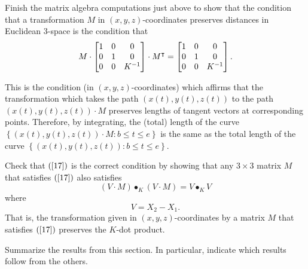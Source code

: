 \documentclass{ximera}
\begin{document}
\begin{problem}
Finish the matrix algebra computations just above to show that the condition
that a transformation $M$ in $\left(  x,y,z\right)  $-coordinates preserves
distances in Euclidean $3$-space is the condition that%
\begin{equation}
M\cdot\begin{bmatrix}
%
1 & 0 & 0\\
0 & 1 & 0\\
0 & 0 & K^{-1}%
\end{bmatrix}
  \cdot M^\transpose=\begin{bmatrix}
%
1 & 0 & 0\\
0 & 1 & 0\\
0 & 0 & K^{-1}%
\end{bmatrix}
  . \label{17}%
\end{equation}

\end{problem}

This is the condition (in $\left(  x,y,z\right)  $-coordinates) which affirms
that the transformation which takes the path $\left(  x(t),y(t),z(t)\right)  $
to the path $\left(  x(t),y(t),z(t)\right)  \cdot M$ preserves lengths of
tangent vectors at corresponding points. Therefore, by integrating, the
(total) length of the curve $\left\{  \left(  x(t),y(t),z(t)\right)  \cdot
M:b\leq t\leq e\right\}  $ is the same as the total length of the curve
$\left\{  \left(  x(t),y(t),z(t)\right)  :b\leq t\leq e\right\}  $.

\begin{problem}
Check that $\left(  \ref{17}\right)  $ is the correct condition by showing
that any $3\times3$ matrix $M$ that satisfies $\left(  \ref{17}\right)  $ also
satisfies%
\[
\left(   V  \cdot M\right)  \bullet_{K}\left(   V
\cdot M\right)  =V\bullet_{K}V
\]
where%
\[
V=X_{2}-X_{1}.
\]
That is, the transformation given in $\left(  x,y,z\right)  $-coordinates by a
matrix $M$ that satisfies $\left(  \ref{17}\right)  $ preserves the $K$-dot product.
\end{problem}

\begin{problem}
Summarize the results from this section. In particular, indicate which
results follow from the others.
\begin{freeResponse}
\end{freeResponse}
\end{problem}
\end{document}
